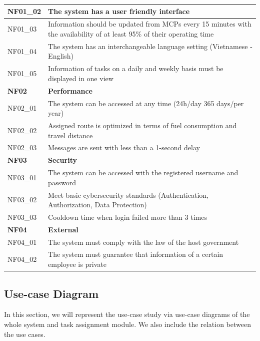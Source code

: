 \documentclass[a4paper, 13pt]{article}
\begin{document}
\begin{longtable}{|p{}|p{}|}
         NF01\_02 &  The system has a user friendly interface \\
         \hline
          NF01\_03 &  Information should be updated from MCPs every 15 minutes with the availability of at least 95\% of their operating time \\
         \hline
          NF01\_04 &  The system has an interchangeable language setting (Vietnamese - English) \\
         \hline
          NF01\_05 &  Information of tasks on a daily and weekly basis must be displayed in one view \\
         \hline
         \rowcolor{moccasin} \textbf{NF02} & \textbf{Performance} \\
         \hline
         NF02\_01 &  The system can be accessed at any time (24h/day 365 days/per year) \\ 
                  \hline
         NF02\_02 &  Assigned route is optimized in terms of fuel consumption and travel distance \\
         \hline
         NF02\_03 &  Messages are sent with less than a 1-second delay \\
         \hline
         \rowcolor{moccasin} \textbf{NF03} & \textbf{Security} \\
         \hline
         NF03\_01 &  The system can be accessed with the registered username and password \\
         \hline
         NF03\_02 &  Meet basic cybersecurity standards (Authentication, Authorization, Data Protection) \\         \hline

         NF03\_03 &  Cooldown time when login failed more than 3 times \\         \hline
         \rowcolor{moccasin} \textbf{NF04} & \textbf{External} \\
         \hline
         NF04\_01 &  The system must comply with the law of the host government \\
         \hline
         NF04\_02 &  The system must guarantee that information of a certain employee is private\\
         \hline
         
    \end{longtable} 
    
\newpage
\subsection{Use-case Diagram}
\begin{tcolorbox}[colback=blue!5!white,colframe=blue!75!black]
  In this section, we will represent the use-case study via use-case diagrams of the whole system and task assignment module. We also include the relation between the use cases.
\end{tcolorbox}
\end{document}
